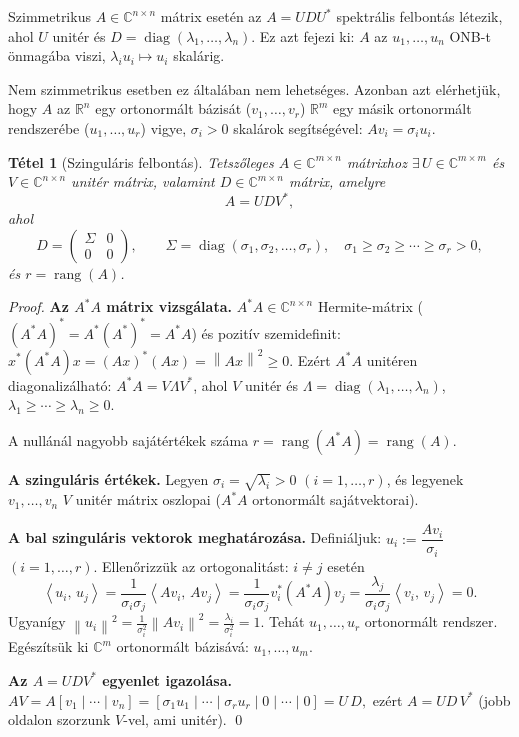 \documentclass[a4paper,12pt]{article}
\theoremstyle{mydef}
\newtheorem{tetel}{Tétel}[section]
\newcommand{\R}{\mathbb{R}}
\newcommand{\C}{\mathbb{C}}
\newcommand{\norm}[1]{\left\|#1\right\|}
\newcommand{\innerprod}[2]{\left\langle #1,\,#2 \right\rangle}
\DeclareMathOperator{\rang}{rang}
\DeclareMathOperator{\diag}{diag}
\begin{document}
Szimmetrikus $A \in \C^{n\times n}$ mátrix esetén az $A = UDU^*$ spektrális felbontás létezik,
ahol $U$ unitér és $D = \diag(\lambda_1, \ldots, \lambda_n)$. Ez azt fejezi ki: $A$ az
$u_1, \ldots, u_n$ ONB-t önmagába viszi, $\lambda_i u_i \mapsto u_i$ skalárig.

Nem szimmetrikus esetben ez általában nem lehetséges. Azonban azt elérhetjük, hogy $A$ az
$\R^n$ egy ortonormált bázisát ($v_1, \ldots, v_r$) $\R^m$ egy másik ortonormált rendszerébe
($u_1, \ldots, u_r$) vigye, $\sigma_i > 0$ skalárok segítségével:
$A v_i = \sigma_i u_i$.

\begin{mdframed}[backgroundcolor=thmbg,linewidth=0pt,innertopmargin=8pt,innerbottommargin=8pt]
\begin{tetel}[Szinguláris felbontás]
\label{tetel:svd}
Tetszőleges $A \in \C^{m\times n}$ mátrixhoz $\exists\, U \in \C^{m\times m}$ és
$V \in \C^{n\times n}$ unitér mátrix, valamint $D \in \C^{m\times n}$ mátrix, amelyre
\[
  A = UDV^*,
\]
ahol
\[
  D = \begin{pmatrix} \Sigma & 0 \\ 0 & 0 \end{pmatrix}, \qquad
  \Sigma = \diag(\sigma_1, \sigma_2, \ldots, \sigma_r), \quad
  \sigma_1 \ge \sigma_2 \ge \cdots \ge \sigma_r > 0,
\]
és $r = \rang(A)$.
\end{tetel}
\end{mdframed}

\begin{proof}
\textbf{Az $A^*A$ mátrix vizsgálata.}
$A^*A \in \C^{n\times n}$ Hermite-mátrix ($(A^*A)^* = A^*(A^*)^* = A^*A$) és pozitív szemidefinit:
$x^*(A^*A)x = (Ax)^*(Ax) = \norm{Ax}^2 \ge 0$. Ezért $A^*A$ unitéren diagonalizálható:
$A^*A = V \Lambda V^*$, ahol $V$ unitér és $\Lambda = \diag(\lambda_1, \ldots, \lambda_n)$,
$\lambda_1 \ge \cdots \ge \lambda_n \ge 0$.

A nullánál nagyobb sajátértékek száma $r = \rang(A^*A) = \rang(A)$.

\textbf{A szinguláris értékek.}
Legyen $\sigma_i = \sqrt{\lambda_i} > 0$ $(i = 1, \ldots, r)$, és legyenek $v_1, \ldots, v_n$
$V$ unitér mátrix oszlopai ($A^*A$ ortonormált sajátvektorai).

\textbf{A bal szinguláris vektorok meghatározása.}
Definiáljuk: $u_i := \dfrac{Av_i}{\sigma_i}$ $(i = 1, \ldots, r)$. Ellenőrizzük az
ortogonalitást: $i \ne j$ esetén
\[
  \innerprod{u_i}{u_j} = \frac{1}{\sigma_i\sigma_j}\innerprod{Av_i}{Av_j}
  = \frac{1}{\sigma_i\sigma_j} v_i^*(A^*A)v_j
  = \frac{\lambda_j}{\sigma_i\sigma_j}\innerprod{v_i}{v_j} = 0.
\]
Ugyanígy $\norm{u_i}^2 = \tfrac{1}{\sigma_i^2}\norm{Av_i}^2 = \tfrac{\lambda_i}{\sigma_i^2} = 1$.
Tehát $u_1, \ldots, u_r$ ortonormált rendszer. Egészítsük ki $\C^m$ ortonormált bázisává:
$u_1, \ldots, u_m$.

\textbf{Az $A = UDV^*$ egyenlet igazolása.}
$AV = A[v_1 \mid \cdots \mid v_n] = [\sigma_1 u_1 \mid \cdots \mid \sigma_r u_r \mid 0 \mid \cdots \mid 0]
= U\,D,$
ezért $A = UD\,V^*$ (jobb oldalon szorzunk $V$-vel, ami unitér). \qed
\end{proof}
\end{document}
